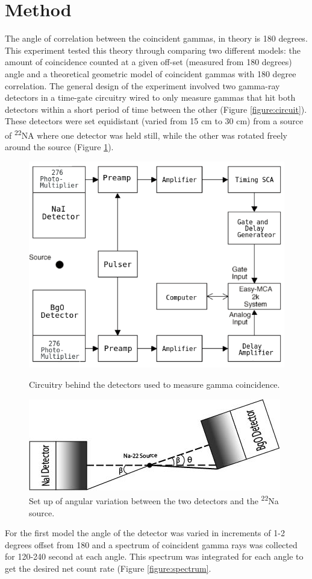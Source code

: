 \documentclass[12pt, letterpaper, twocolumn]{article}
\begin{document}
\section{Method}
The angle of correlation between the coincident gammas, in theory is 180
degrees. This experiment tested this theory through comparing two different
models: the amount of coincidence counted at a given off-set (measured from
180 degrees) angle and a theoretical geometric model of coincident gammas with
180 degree correlation. \setlength{\parskip}{6pt} The general design of the
experiment involved two gamma-ray detectors in a time-gate circuitry wired to
only measure gammas that hit both detectors within a short period of time
between the other (Figure \ref{figure:circuit}). These detectors were set
equidistant (varied from 15 cm to 30 cm) from a source of \textsuperscript{22}NA
where one detector was held still, while the other was rotated freely around the
source (Figure \ref{figure:set_up}).
\begin{figure}[H]
    \centering
    \includegraphics[width=0.45\linewidth]{Figures/gamma_coin_circuitry.png}
    \caption{Circuitry behind the detectors used to measure gamma coincidence.}
    \label{figure:circuit}
    \includegraphics[width=0.45\linewidth]{Figures/detector_set_up.jpg}
    \caption{Set up of angular variation between the two detectors and the
    \textsuperscript{22}Na source.}
    \label{figure:set_up}
\end{figure}
For the first model the angle of the detector was varied in increments of 1-2
degrees offset from 180 and a spectrum of coincident gamma rays was collected
for 120-240 second at each angle. This spectrum was integrated for each angle
to get the desired net count rate (Figure \ref{figure:spectrum}.
\end{document}
